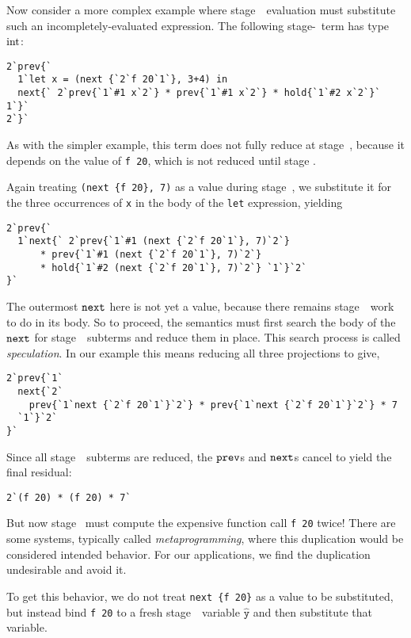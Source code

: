 Now consider a more complex example where stage~\bbone\ evaluation must
substitute such an incompletely-evaluated expression. The following
stage-\bbtwo\ term has type ${\rm int}$:
\begin{lstlisting} 
2`prev{`
  1`let x = (next {`2`f 20`1`}, 3+4) in
  next{` 2`prev{`1`#1 x`2`} * prev{`1`#1 x`2`} * hold{`1`#2 x`2`}` 1`}`
2`}`
\end{lstlisting}
As with the simpler example, this term does not fully reduce at stage~\bbone, 
because it depends on the value of \verb|f 20|, which is not reduced until stage \bbtwo.

Again treating \verb|(next {f 20}, 7)| as a value during stage~\bbone, we
substitute it for the three occurrences of \verb|x| in the body of the
\verb|let| expression, yielding
\begin{lstlisting} 
2`prev{`
  1`next{` 2`prev{`1`#1 (next {`2`f 20`1`}, 7)`2`} 
      * prev{`1`#1 (next {`2`f 20`1`}, 7)`2`} 
      * hold{`1`#2 (next {`2`f 20`1`}, 7)`2`} `1`}`2`
}`
\end{lstlisting}
The outermost ${\tt next}$ here is not yet a value, because there remains stage~\bbone\ work to do in its body.
So to proceed, the semantics must first search the body of the ${\tt next}$ for stage~\bbone\ subterms and reduce them in place.
This search process is called {\em speculation}.
In our example this means reducing all three projections to give,
\begin{lstlisting} 
2`prev{`1`
  next{`2` 
    prev{`1`next {`2`f 20`1`}`2`} * prev{`1`next {`2`f 20`1`}`2`} * 7 
  `1`}`2`
}`
\end{lstlisting}
Since all stage~\bbone\ subterms are reduced, the ${\tt prev}$s and ${\tt next}$s cancel to yield the final residual:
\begin{lstlisting} 
2`(f 20) * (f 20) * 7`
\end{lstlisting}
But now stage \bbtwo\ must compute the expensive function call \verb|f 20| twice! 
There are some systems, typically called {\em metaprogramming}, 
where this duplication would be considered intended behavior.
For our applications, we find the duplication undesirable and avoid it.

To get this behavior, we do not treat \verb|next {f 20}| as a value to be substituted, 
but instead bind \verb|f 20| to a fresh stage~\bbtwo\ variable $\mathtt{\hat y}$
and then substitute that variable.

